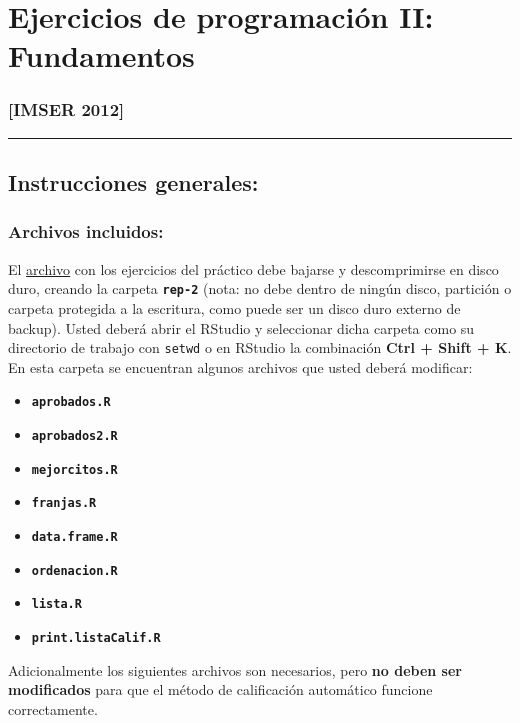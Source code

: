 \documentclass[]{article}
\begin{document}
\section{Ejercicios de programación II: Fundamentos}

\subsubsection{{[}IMSER 2012{]}}

\begin{center}\rule{3in}{0.4pt}\end{center}

\subsection{Instrucciones generales:}

\subsubsection{Archivos incluidos:}

El
\href{http://eva.universidad.edu.uy/file.php/1454/ejercicios\_de\_programacion/rep-1.zip}{archivo}
con los ejercicios del práctico debe bajarse y descomprimirse en disco
duro, creando la carpeta \textbf{\texttt{rep-2}} (nota: no debe dentro
de ningún disco, partición o carpeta protegida a la escritura, como
puede ser un disco duro externo de backup). Usted deberá abrir el
RStudio y seleccionar dicha carpeta como su directorio de trabajo con
\texttt{setwd} o en RStudio la combinación \textbf{Ctrl + Shift + K}. En
esta carpeta se encuentran algunos archivos que usted deberá modificar:

\begin{itemize}
\item
  \textbf{\texttt{aprobados.R}}
\item
  \textbf{\texttt{aprobados2.R}}
\item
  \textbf{\texttt{mejorcitos.R}}
\item
  \textbf{\texttt{franjas.R}}
\item
  \textbf{\texttt{data.frame.R}}
\item
  \textbf{\texttt{ordenacion.R}}
\item
  \textbf{\texttt{lista.R}}
\item
  \textbf{\texttt{print.listaCalif.R}}
\end{itemize}
Adicionalmente los siguientes archivos son necesarios, pero \textbf{no
deben ser modificados} para que el método de calificación automático
funcione correctamente.
\end{document}
